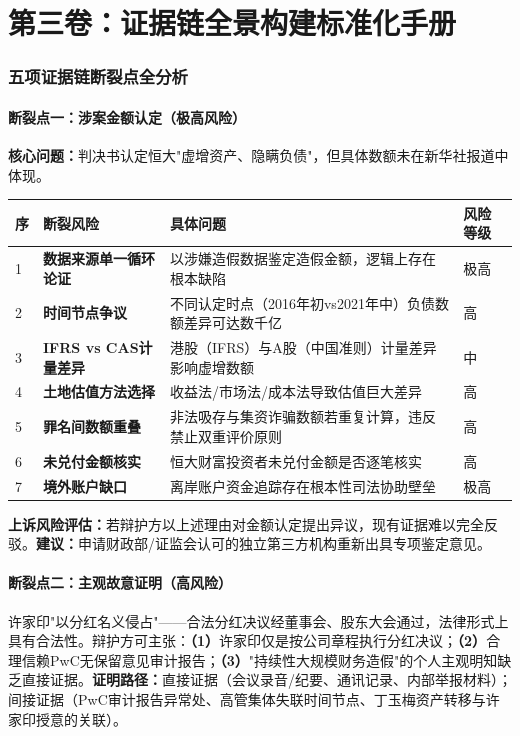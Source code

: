 \documentclass[11pt,a4paper,oneside,openany]{article}
\begin{document}
\part{第三卷：证据链全景构建标准化手册}

\section{五项证据链断裂点全分析}

\subsection{断裂点一：涉案金额认定（极高风险）}
\textbf{核心问题：}判决书认定恒大"虚增资产、隐瞒负债"，但具体数额未在新华社报道中体现。

\begin{threeparttable}
\caption{涉案金额认定的七大证据断裂风险}
\begin{tabular}{p{0.4cm}p{4cm}p{3cm}p{1.5cm}}
\toprule
\textbf{序} & \textbf{断裂风险} & \textbf{具体问题} & \textbf{风险等级} \\
\midrule
1 & \textbf{数据来源单一循环论证} & 以涉嫌造假数据鉴定造假金额，逻辑上存在根本缺陷 & \cellcolor{highrisk}极高 \\
2 & \textbf{时间节点争议} & 不同认定时点（2016年初vs2021年中）负债数额差异可达数千亿 & \cellcolor{highrisk}高 \\
3 & \textbf{IFRS vs CAS计量差异} & 港股（IFRS）与A股（中国准则）计量差异影响虚增数额 & 中 \\
4 & \textbf{土地估值方法选择} & 收益法/市场法/成本法导致估值巨大差异 & \cellcolor{highrisk}高 \\
5 & \textbf{罪名间数额重叠} & 非法吸存与集资诈骗数额若重复计算，违反禁止双重评价原则 & \cellcolor{highrisk}高 \\
6 & \textbf{未兑付金额核实} & 恒大财富投资者未兑付金额是否逐笔核实 & 高 \\
7 & \textbf{境外账户缺口} & 离岸账户资金追踪存在根本性司法协助壁垒 & \cellcolor{highrisk}极高 \\
\bottomrule
\end{tabular}
\end{threeparttable}

\textbf{上诉风险评估：}若辩护方以上述理由对金额认定提出异议，现有证据难以完全反驳。\textbf{建议：}申请财政部/证监会认可的独立第三方机构重新出具专项鉴定意见。

\subsection{断裂点二：主观故意证明（高风险）}
许家印"以分红名义侵占"——合法分红决议经董事会、股东大会通过，法律形式上具有合法性。辩护方可主张：\textbf{（1）}许家印仅是按公司章程执行分红决议；\textbf{（2）}合理信赖PwC无保留意见审计报告；\textbf{（3）}"持续性大规模财务造假"的个人主观明知缺乏直接证据。\textbf{证明路径：}直接证据（会议录音/纪要、通讯记录、内部举报材料）；间接证据（PwC审计报告异常处、高管集体失联时间节点、丁玉梅资产转移与许家印授意的关联）。
\end{document}
